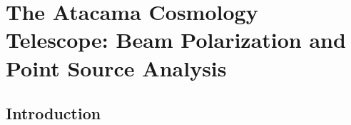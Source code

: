 \chapter{The Atacama Cosmology Telescope: Beam Polarization and Point Source Analysis}
\label{ch:actbeams}
\section{Introduction}